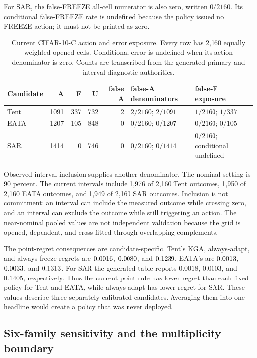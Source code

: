 For SAR, the false-FREEZE all-cell numerator is also zero, written $0/2160$.  Its conditional
false-FREEZE rate is undefined because the policy issued no FREEZE action; it must not be printed as
zero.

\begin{table}[t]
\centering
\small
\caption{Current CIFAR-10-C action and error exposure.  Every row has 2,160 equally weighted
opened cells.  Conditional error is undefined when its action denominator is zero.  Counts are
transcribed from the generated primary and interval-diagnostic authorities.}
\label{fr:tab-cifar-actions}
\begin{tabular}{@{}lrrrrll@{}}
\toprule
Candidate & A & F & U & false A & false-A denominators & false-F exposure \\
\midrule
Tent & 1091 & 337 & 732 & 2 & $2/2160$; $2/1091$ & $1/2160$; $1/337$ \\
EATA & 1207 & 105 & 848 & 0 & $0/2160$; $0/1207$ & $0/2160$; $0/105$ \\
SAR & 1414 & 0 & 746 & 0 & $0/2160$; $0/1414$ & $0/2160$; conditional undefined \\
\bottomrule
\end{tabular}
\end{table}

Observed interval inclusion supplies another denominator.  The nominal setting is 90 percent.
The current intervals include 1,976 of 2,160 Tent outcomes, 1,950 of 2,160 EATA outcomes, and
1,949 of 2,160 SAR outcomes.  Inclusion is not commitment: an interval can include the measured
outcome while crossing zero, and an interval can exclude the outcome while still triggering an
action.  The near-nominal pooled values are not independent validation because the grid is opened,
dependent, and cross-fitted through overlapping complements.

The point-regret consequences are candidate-specific.  Tent's KGA, always-adapt, and always-freeze
regrets are $0.0016$, $0.0080$, and $0.1239$.  EATA's are
$0.0013$, $0.0033$, and $0.1313$.  For SAR the generated table reports
$0.0018$, $0.0003$, and $0.1405$, respectively.  Thus the current point rule has lower regret than
each fixed policy for Tent and EATA, while always-adapt has lower regret for SAR.  These values
describe three separately calibrated candidates.  Averaging them into one headline would create a
policy that was never deployed.

\subsection{Six-family sensitivity and the multiplicity boundary}
\label{fr:sec-cifar-family-inference}

